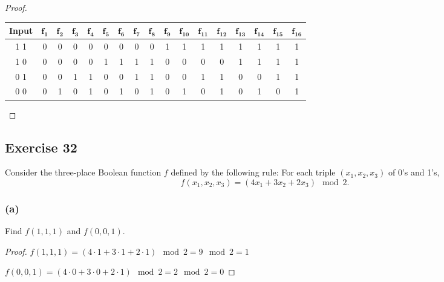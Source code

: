 \documentclass[14pt]{extarticle}
\begin{document}
\begin{proof}
    \begin{center}
        \begin{tabular}{|c|c|c|c|c|c|c|c|c|c|c|c|c|c|c|c|c|}
            \hline
            {\bf Input}     & \(\bm{f_{1}}\)  & \(\bm{f_{2}}\)  &
            \(\bm{f_{3}}\)  & \(\bm{f_{4}}\)  & \(\bm{f_{5}}\)  &
            \(\bm{f_{6}}\)  & \(\bm{f_{7}}\)  & \(\bm{f_{8}}\)  &
            \(\bm{f_{9}}\)  & \(\bm{f_{10}}\) & \(\bm{f_{11}}\) &
            \(\bm{f_{12}}\) & \(\bm{f_{13}}\) & \(\bm{f_{14}}\) &
            \(\bm{f_{15}}\) & \(\bm{f_{16}}\)                                                                           \\
            \hline
            1 1             & 0               & 0               & 0 & 0 & 0 & 0 & 0 & 0 & 1 & 1 & 1 & 1 & 1 & 1 & 1 & 1 \\
            \hline
            1 0             & 0               & 0               & 0 & 0 & 1 & 1 & 1 & 1 & 0 & 0 & 0 & 0 & 1 & 1 & 1 & 1 \\
            \hline
            0 1             & 0               & 0               & 1 & 1 & 0 & 0 & 1 & 1 & 0 & 0 & 1 & 1 & 0 & 0 & 1 & 1 \\
            \hline
            0 0             & 0               & 1               & 0 & 1 & 0 & 1 & 0 & 1 & 0 & 1 & 0 & 1 & 0 & 1 & 0 & 1 \\
            \hline
        \end{tabular}
    \end{center}
\end{proof}

\subsection{Exercise 32}
Consider the three-place Boolean function $f$ defined by the following rule: For each triple \((x_1, x_2, x_3)\) of
0’s and 1’s,
\[
    f(x_1, x_2, x_3) = (4x_1 + 3x_2 + 2x_3) \mod 2.
\]
\subsubsection{(a)}
Find $f(1, 1, 1)$ and $f(0, 0, 1)$.

\begin{proof}
    \(f(1, 1, 1) = (4 \cdot 1 + 3 \cdot 1 + 2 \cdot 1) \mod 2 = 9 \mod 2 = 1\)

    \(f(0, 0, 1) = (4 \cdot 0 + 3 \cdot 0 + 2 \cdot 1) \mod 2 = 2 \mod 2 = 0\)
\end{proof}
\end{document}

